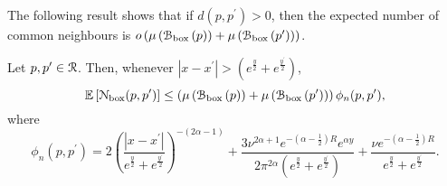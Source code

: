 %	
%	
%	
%    
%    
%    
%    
%    
%    
%    
%    
%    
%    
%    
%    

The following result shows that if $d(p,p^\prime) > 0$, then the expected number of common neighbours is $o\left(\mu\left({\mathcal B}_{\text{box}}\left(p\right)\right) + \mu\left({\mathcal B}_{\text{box}}\left(p^\prime\right)\right)\right)$.

\begin{lemma}\label{lem:common_neighbours_Pcal_n}
Let $p, p^\prime \in {\mathcal R}$. Then, whenever $|x - x^\prime| > \left(e^{\frac{y}{2}} + e^{\frac{y^\prime}{2}}\right)$,
\[
	\mathbb{E}\left[{\mathcal N}_{\text{box}}(p,p^\prime)\right] \le \left(\mu\left({\mathcal B}_{\text{box}}\left(p\right)\right) + \mu\left({\mathcal B}_{\text{box}}\left(p^\prime\right)\right)\right)\phi_n(p,p^\prime),
\]
where
\[
	\phi_n(p,p^\prime) = 2\left(\frac{|x - x^\prime|}{e^{\frac{y}{2}} + e^{\frac{y^\prime}{2}}}\right)^{-(2\alpha - 1)} 
	+ \frac{3 \nu^{2\alpha + 1}e^{-(\alpha - \frac{1}{2})R} e^{\alpha y}}{2 \pi^{2\alpha}\left(
	e^{\frac{y}{2}} + e^{\frac{y^\prime}{2}}\right)}
	+ \frac{\nu e^{-(\alpha - \frac{1}{2})R}}{e^{\frac{y}{2}} + e^{\frac{y^\prime}{2}}}. 
\]
\end{lemma}

